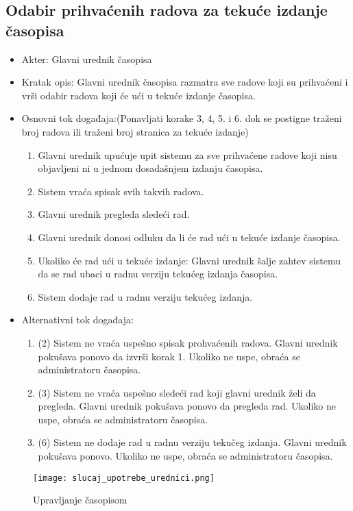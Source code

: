 \documentclass[a4paper]{article}
\begin{document}
\subsection{Odabir prihvaćenih radova za tekuće izdanje časopisa}
\begin{itemize}
    \item Akter: Glavni urednik časopisa
    \item Kratak opis: Glavni urednik časopisa razmatra sve radove koji su prihvaćeni i vrši odabir radova koji će ući u tekuće izdanje časopisa.
    \item Osnovni tok događaja:(Ponavljati korake 3, 4, 5. i 6. dok se postigne traženi broj radova ili traženi broj stranica za tekuće izdanje)
        \begin{enumerate}
            \item Glavni urednik upućuje upit sistemu za sve prihvaćene radove koji nisu objavljeni ni u jednom dosadašnjem izdanju časopisa.
            \item Sistem vraća spisak svih takvih radova.
            \item Glavni urednik pregleda sledeći rad.
            \item Glavni urednik donosi odluku da li će rad ući u tekuće izdanje časopisa.
            \item Ukoliko će rad ući u tekuće izdanje: Glavni urednik šalje zahtev sistemu da se rad ubaci u radnu verziju tekućeg izdanja časopisa.
            \item Sistem dodaje rad u radnu verziju tekućeg izdanja.
        \end{enumerate}
    \item Alternativni tok događaja:
        \begin{enumerate}
            \item  (2) Sistem ne vraća uspešno spisak prohvaćenih radova. Glavni urednik pokušava ponovo da izvrši korak 1. Ukoliko ne uspe, obraća se administratoru časopisa.
            \item (3) Sistem ne vraća uspešno sledeći rad koji glavni urednik želi da pregleda. Glavni urednik pokušava ponovo da pregleda rad. Ukoliko ne uspe, obraća se administratoru časopisa.
            \item (6) Sistem ne dodaje rad u radnu verziju tekučeg izdanja. Glavni urednik pokušava ponovo. Ukoliko ne uspe, obraća se administratoru časopisa.
        \end{enumerate}
\end{itemize}

\begin{figure}[hbt!]
    \centering
    \texttt{[image: slucaj\_upotrebe\_urednici.png]}
    \caption{Upravljanje časopisom}
    \label{fig:my_label}
\end{figure}
\end{document}
